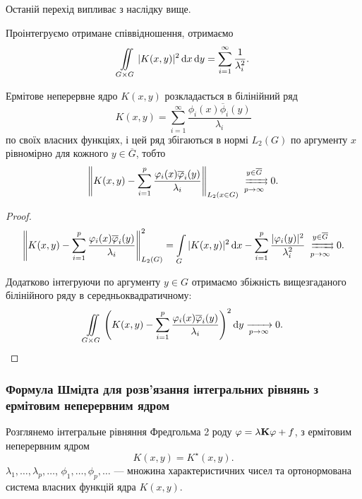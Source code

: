 \begin{remark}
	Останій перехід випливає з наслідку вище.
\end{remark}

Проінтегруємо отримане співвідношення, отримаємо
\begin{equation}
	\Iint_{G \times G} |K(x, y)|^2 \diff x \diff y = \Sum_{i = 1}^\infty \dfrac{1}{\lambda_i^2}.
\end{equation}

\begin{theorem}
	Ермітове неперервне ядро $K(x, y)$ розкладається в білінійний ряд
	\begin{equation}
		K(x, y) = \sum_{i=1}^\infty \frac{\phi_i(x) \overline \phi_i(y)}{\lambda_i}
	\end{equation}
	по своїх власних функціях, і цей ряд збігаються в нормі $L_2(G)$ по аргументу $x$ рівномірно для кожного $y \in \overline G$, тобто 
	\begin{equation}
		\left\| K(x, y) - \Sum_{i=1}^p \dfrac{\phi_i(x)\overline \phi_i(y)}{\lambda_i}\right\|_{L_2(x \in G)} \xrightrightarrows[p \to \infty]{y \in \overline G} 0.
	\end{equation}
\end{theorem}

\begin{proof}
	\begin{equation}
		\left\| K(x, y) - \Sum_{i = 1}^p \dfrac{\phi_i(x) \overline \phi_i(y)}{\lambda_i} \right\|_{L_2(G)}^2 = \Int_G |K(x, y)|^2 \diff x - \Sum_{i = 1}^p \dfrac{|\phi_i(y)|^2}{\lambda_i^2} \xrightrightarrows[p \to \infty]{y \in \overline G} 0.
	\end{equation}

	Додатково інтегруючи по аргументу $y \in G$ отримаємо збіжність вищезгаданого білінійного ряду в середньоквадратичному:
	\begin{equation}
		\Iint_{G \times G} \left( K(x, y) - \Sum_{i = 1}^p \dfrac{\phi_i(x) \overline \phi_i(y)}{\lambda_i} \right)^2 \diff y \xrightarrow[p \to \infty]{} 0.
	\end{equation}
\end{proof}

\subsubsection{Формула Шмідта для розв'язання інтегральних рівнянь з ермітовим неперервним ядром}

Розглянемо інтегральне рівняння Фредгольма 2 роду $\phi = \lambda \bf{K} \phi + f$, з ермітовим неперервним ядром 
\begin{equation} 
	K(x, y) = K^\star  (x, y).
\end{equation}
$\lambda_1, \ldots, \lambda_p, \ldots$, $\phi_1, \ldots, \phi_p, \ldots$ --- множина характеристичних чисел та ортонормована система власних функцій ядра $K(x, y)$. \medskip


